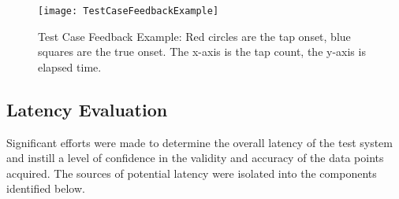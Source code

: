 \begin{figure}[]
    \centering
    \texttt{[image: TestCaseFeedbackExample]}
    \caption{Test Case Feedback Example: Red circles are the tap onset, blue squares are the true onset. The x-axis is the tap count, the y-axis is elapsed time.}
    \label{fig:TestCaseFeedbackEx}
\end{figure}

\subsection{Latency Evaluation} \label{latencyCalc}
Significant efforts were made to determine the overall latency of the test system and instill a level of confidence in the validity and accuracy of the data points acquired. The sources of potential latency were isolated into the components identified below.
